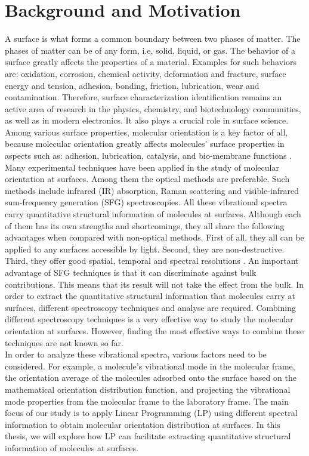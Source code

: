  \label{ch:1}
\section{Background and Motivation}
A surface is what forms a common boundary between two phases of matter. The phases of matter can be of any form, i.e, solid, liquid, or gas. The behavior of a surface greatly affects the properties of a material. Examples for such behaviors are: oxidation, corrosion, chemical activity, deformation and fracture, surface energy and tension, adhesion, bonding, friction, lubrication, wear and contamination. Therefore, surface characterization identification remains an active area of research in the physics, chemistry, and biotechnology communities, as well as in modern electronics. It also plays a crucial role in surface science. Among various surface properties, molecular orientation is a key factor of all, because molecular orientation greatly affects molecules' surface properties in aspects such as: adhesion, lubrication, catalysis, and bio-membrane functions \cite{PhysRevB.59.12632}.\\

Many experimental techniques have been applied in the study of molecular orientation at surfaces. Among them the optical methods are preferable. Such methods include infrared (IR) absorption, Raman scattering and visible-infrared sum-frequency generation (SFG) spectroscopies. All these vibrational spectra carry quantitative structural information of molecules at surfaces. Although each of them has its own strengths and shortcomings, they all share the following advantages when compared with non-optical methods. First of all, they all can be applied to any surfaces accessible by light. Second, they are non-destructive. Third, they offer good spatial, temporal and spectral resolutions \cite{Brasselet:11, PhysRevB.59.12632}. An important advantage of SFG techniques is that it can discriminate against bulk contributions. This means that its result will not take the effect from the bulk. In order to extract the quantitative structural information that molecules carry at surfaces, different spectroscopy techniques and analyse are required. Combining different spectroscopy techniques is a very effective way to study the molecular orientation at surfaces. However, finding the most effective ways to combine these techniques are not known so far.\\

In order to analyze these vibrational spectra, various factors need to be considered. For example, a molecule's vibrational mode in the molecular frame, the orientation average of the molecules adsorbed onto the surface based on the mathematical orientation distribution function, and projecting the vibrational mode properties from the molecular frame to the laboratory frame. The main focus of our study is to apply Linear Programming (LP) using different spectral information to obtain molecular orientation distribution at surfaces. In this thesis, we will explore how LP can facilitate extracting quantitative structural information of molecules at surfaces.\\

